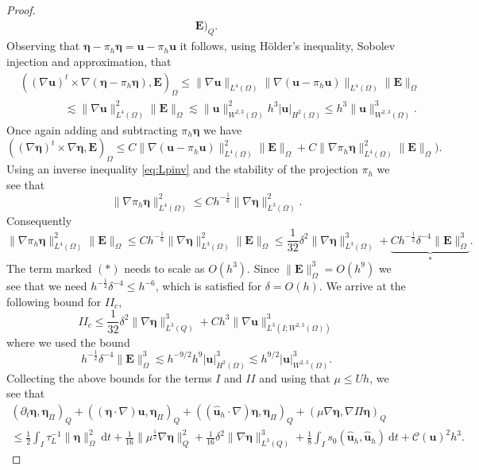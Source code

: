 \documentclass[10pt]{amsart}
\numberwithin{equation}{section}
\theoremstyle{definition}
\theoremstyle{remark}
\renewcommand{\(}{\bigl(}
\renewcommand{\)}{\bigr)}
\newcommand{\bld}[1]{\boldsymbol{#1}}
\newcommand{\bu}{\bld{u}}
\newcommand{\bhu}{\hat{\bld{u}}}
\newcommand{\bE}{\bld{E}}
\newcommand{\bldeta}{\bld{\eta}}
\begin{document}
\begin{proof}
\begin{multline}
\bE)_Q.
\end{multline}
Observing that $\bldeta - \pi_h \bldeta = \bu - \pi_h \bu$ it follows,
using H\"older's inequality, Sobolev injection and approximation, that
\begin{align*}
&((\nabla \bu)^t \times \nabla (\bldeta - \pi_h \bldeta) ,
\bE)_{\Omega} \leq \|\nabla \bu\|_{L^{4}(\Omega)} \|\nabla (\bu -
\pi_h \bu)\|_{L^{4}(\Omega)} \|\bE\|_\Omega 
\\
&\qquad \qquad \lesssim  \|\nabla
\bu\|_{L^{4}(\Omega)}^2 \|\bE\|_\Omega
\lesssim \|\bu\|^2_{W^{2,3}(\Omega)} h^3 |\bu|_{H^2(\Omega)}\leq h^3 \|\bu\|^3_{W^{2,3}(\Omega)}.
\end{align*}
Once again adding and subtracting $\pi_h \bldeta$ we have
\[
 ((\nabla \bldeta)^t \times \nabla \bldeta ,
\bE)_\Omega \leq C \|\nabla (\bu- \pi_h \bu)\|^2_{L^4(\Omega)}
\|\bE\|_\Omega + C \|\nabla \pi_h \bldeta\|^2_{L^4(\Omega)}\|\bE\|_{\Omega}).
\]
Using an inverse inequality \eqref{eq:Lpinv} and the stability of the projection $\pi_h$ we see that
\[
\|\nabla \pi_h \bldeta\|^2_{L^4(\Omega)} \leq C h^{-\frac16} \|\nabla \bldeta\|^2_{L^3(\Omega)}.
\]
Consequently
\[
\|\nabla \pi_h \bldeta\|^2_{L^4(\Omega)}\|\bE\|_{\Omega} \leq C h^{-\frac16}
\|\nabla \bldeta\|^2_{L^3(\Omega)} \|\bE\|_{\Omega} \leq \frac{1}{32}
\delta^2 \|\nabla \bldeta\|^3_{L^3(\Omega)} + \underbrace{ C h^{-\frac12} \delta^{-4} \|\bE\|_{\Omega}^3}_{*}.
\]
The term marked $(*)$ needs to scale as $O(h^3)$. Since
$\|\bE\|_{\Omega}^3 = O(h^9)$ we see that we need  $h^{-\frac12} \delta^{-4}
\leq h^{-6}$, which is satisfied for $\delta = O(h)$.
%
We arrive at the following bound for $II_c$,
\begin{equation*}
II_c \leq   \frac{1}{32}
\delta^2 \|\nabla \bldeta\|^3_{L^3(Q)} + C h^3 \|\nabla
\bu\|_{L^3(I;W^{2,3}(\Omega))}^3 
\end{equation*}
where we used the bound
\[
 h^{-\frac12} \delta^{-4} \|\bE\|_{\Omega}^3 \lesssim h^{-9/2} h^9
 |\bu|_{H^2(\Omega)}^3 \lesssim h^{9/2} |\bu|_{W^{2,3}(\Omega)}^3.
\]
Collecting the above bounds for the terms $I$ and $II$ and using that
$\mu \leq U h$, we see that
\begin{multline}\label{eq:convect}
(\partial_t \bldeta, \bldeta_\Pi)_Q   + ((\bldeta \cdot \nabla)
\bu,\bldeta_\Pi)_Q 
+ ((\bhu_h \cdot \nabla) \bldeta,\bldeta_\Pi)_Q +(\mu \nabla \bldeta, \nabla
\Pi \bldeta)_Q \\
\leq   \frac12\int_I \tau_L^{-1}  \|\bldeta\|_\Omega^2 ~\mbox{d}t   + \frac{1}{16} \|\mu^{\frac12}
\nabla \bldeta\|_Q^2+ \frac{1}{16}
\delta^2 \|\nabla \bldeta\|^3_{L^3(Q)} + \frac18 \int_I s_0(\bhu_h,\bhu_h)
~\mbox{d}t 
+ \mathcal{C}(\bu)^2 h^3.
\end{multline} 


\end{proof}
\end{document}
